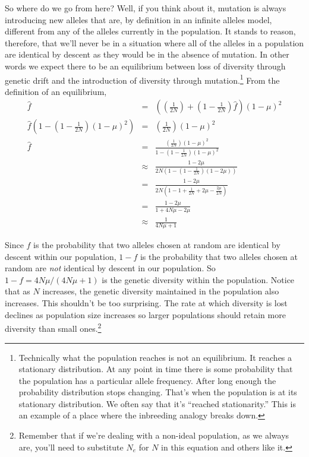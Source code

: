 \documentclass[12pt]{article}
\begin{document}
So where do we go from here? Well, if you think about it, mutation is
always introducing new alleles that are, by definition in an infinite
alleles model, different from any of the alleles currently in the
population. It stands to reason, therefore, that we'll never be in a
situation where all of the alleles in a population are identical by
descent as they would be in the absence of mutation. In other words we
expect there to be an equilibrium between loss of diversity through
genetic drift and the introduction of diversity through
mutation.\footnote{Technically what the population reaches is not an
  equilibrium. It reaches a stationary distribution. At any point in
  time there is some probability that the population has a particular
  allele frequency. After long enough the probability distribution
  stops changing. That's when the population is at its stationary
  distribution. We often say that it's ``reached stationarity.'' This
  is an example of a place where the inbreeding analogy breaks down.} From
the definition of an equilibrium,
\begin{eqnarray*}
\hat f &=& \left(\left(\frac{1}{2N}\right) +
          \left(1 - \frac{1}{2N}\right)\hat f\right)(1-\mu)^2 \\
\hat f\left(1 -
\left(1 - \frac{1}{2N}\right)(1-\mu)^2\right)
       &=& \left(\frac{1}{2N}\right)(1-\mu)^2 \\
\hat f &=& \frac{\left(\frac{1}{2N}\right)(1-\mu)^2}
           {1 -\left(1 - \frac{1}{2N}\right)(1-\mu)^2} \\
       &\approx& \frac{1 - 2\mu}
           {2N\left(1 - \left(1 - \frac{1}{2N}\right)(1-2\mu)\right)} \\
       &=& \frac{1 - 2\mu}
           {2N\left(1 - 1 + \frac{1}{2N} + 2\mu -
            \frac{2\mu}{2N}\right)} \\
       &=& \frac{1 - 2\mu}{1 + 4N\mu - 2\mu} \\
       &\approx& \frac{1}{4N\mu + 1}
\end{eqnarray*}

Since $f$ is the probability that two alleles chosen at random are
identical by descent within our population, $1-f$ is the probability
that two alleles chosen at random are {\it not\/} identical by descent
in our population. So $1-f = 4N\mu/(4N\mu + 1)$ is the genetic
diversity within the population. Notice that as $N$ increases, the
genetic diversity maintained in the population also increases. This
shouldn't be too surprising. The rate at which diversity is lost
declines as population size increases so larger populations should
retain more diversity than small ones.\footnote{Remember that if we're
  dealing with a non-ideal population, as we always are, you'll need
  to substitute $N_e$ for $N$ in this equation and others like it.}
\end{document}
